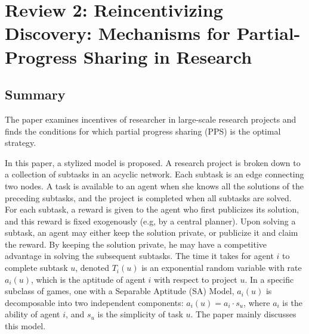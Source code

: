 \documentclass[a4paper,10pt]{article}
\theoremstyle{definition}
\begin{document}
\section*{Review 2: Reincentivizing Discovery: Mechanisms for Partial-Progress Sharing in Research}

\subsection*{Summary}
	The paper examines incentives of researcher in large-scale research projects and finds the conditions for which partial progress sharing (PPS) is the optimal strategy.
	
	In this paper, a stylized model is proposed. A research project is broken down to a collection of subtasks in an acyclic network. Each subtask is an edge connecting two nodes. A task is available to an agent when she knows all the solutions of the preceding subtasks, and the project is completed when all subtasks are solved. For each subtask, a reward is given to the agent who first publicizes its solution, and this reward is fixed exogenously (e.g, by a central planner). Upon solving a subtask, an agent may either keep the solution private, or publicize it and claim the reward. By keeping the solution private, he may have a competitive advantage in solving the subsequent subtasks. The time it takes for agent $i$ to complete subtask $u$, denoted $T_i(u)$ is an exponential random variable with rate $a_i(u)$, which is the aptitude of agent $i$ with respect to project $u$. In a specific subclass of games, one with a Separable Aptitude (SA) Model, $a_i(u)$ is decomposable into two independent components: $a_i(u) = a_i \cdot s_u$, where $a_i$ is the ability of agent $i$, and $s_u$ is the simplicity of task $u$. The paper mainly discusses this model.
	
\end{document}
